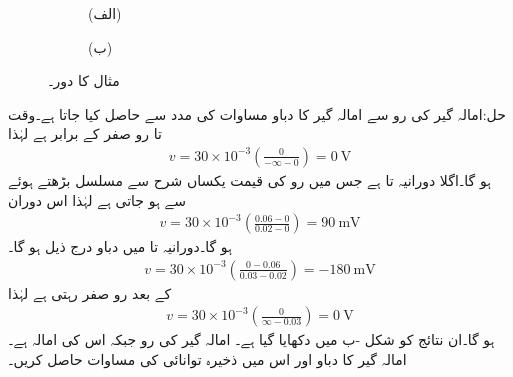 \begin{figure}
\centering
\begin{subfigure}{0.5\textwidth}
\caption*{(الف)}
\end{subfigure}%
\begin{subfigure}{0.5\textwidth}
\caption*{(ب)}
\end{subfigure}%
\caption{مثال  کا دور۔}
\label{شکل_امالہ_یکسمتی_دور_ب}
\end{figure}

حل:امالہ گیر کی رو سے امالہ گیر کا دباو مساوات  کی مدد سے حاصل کیا جاتا ہے۔وقت  تا  رو صفر کے برابر ہے لہٰذا
\begin{align*}
v=30\times 10^{-3} \left(\frac{0}{-\infty-0}\right)=\SI{0}{\volt}
\end{align*}
ہو گا۔اگلا دورانیہ  تا  ہے جس میں رو کی قیمت  یکساں شرح سے مسلسل بڑھتے ہوئے  سے  ہو جاتی ہے لہٰذا اس دوران
\begin{align*}
v=30\times 10^{-3} \left(\frac{0.06-0}{0.02-0}\right)=\SI{90}{\milli\volt}
\end{align*}
ہو گا۔دورانیہ  تا  میں دباو درج ذیل ہو گا۔
\begin{align*}
v=30\times 10^{-3} \left(\frac{0-0.06}{0.03-0.02}\right)=\SI{-180}{\milli\volt}
\end{align*}
 کے بعد رو صفر رہتی ہے لہٰذا
\begin{align*}
v=30\times 10^{-3} \left(\frac{0}{\infty-0.03}\right)=\SI{0}{\volt}
\end{align*}
ہو گا۔ان نتائج کو شکل -ب میں دکھایا گیا ہے۔
امالہ گیر کی رو  جبکہ اس کی امالہ  ہے۔امالہ گیر کا دباو اور اس میں ذخیرہ توانائی کی مساوات حاصل کریں۔

